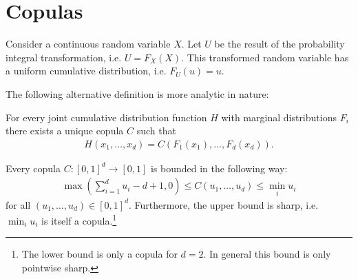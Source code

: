 \section{Copulas}

    \begin{property}
        Consider a continuous random variable $X$. Let $U$ be the result of the probability integral transformation, i.e. $U = F_X(X)$. This transformed random variable has a uniform cumulative distribution, i.e. $F_U(u) = u$.
    \end{property}


    The following alternative definition is more analytic in nature:

    \begin{theorem}[Sklar]
        For every joint cumulative distribution function $H$ with marginal distributions $F_i$ there exists a unique copula $C$ such that
        \begin{gather}
        H(x_1, \ldots, x_d) = C(F_1(x_1), \ldots, F_d(x_d)).
        \end{gather}
    \end{theorem}

    \begin{property}
        Every copula $C:[0,1]^d\rightarrow[0,1]$ is bounded in the following way:
        \begin{gather}
        \max\left(\sum_{i=1}^du_i-d+1, 0\right)\leq C(u_1, \ldots, u_d)\leq \min_iu_i
        \end{gather}
        for all $(u_1, \ldots, u_d)\in[0,1]^d$. Furthermore, the upper bound is sharp, i.e. $\min_iu_i$ is itself a copula.\footnote{The lower bound is only a copula for $d=2$. In general this bound is only pointwise sharp.}
    \end{property}

